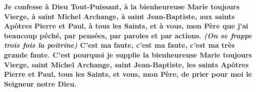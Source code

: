 {\textbf{Je confesse à Dieu Tout-Puissant, à la bienheureuse Marie toujours Vierge, à saint Michel Archange, à saint Jean-Baptiste, aux saints Apôtres Pierre et Paul, à tous les Saints, et à vous, mon Père que j'ai beaucoup péché, par pensées, par paroles et par actions. \emph{ (On se frappe trois fois la poitrine)} C'est ma faute, c'est ma faute, c'est ma très grande faute. C'est pourquoi je supplie la bienheureuse Marie toujours Vierge, saint Michel Archange, saint Jean-Baptiste, les saints Apôtres Pierre et Paul, tous les Saints, et vous, mon Père, de prier pour moi le Seigneur notre Dieu.}}